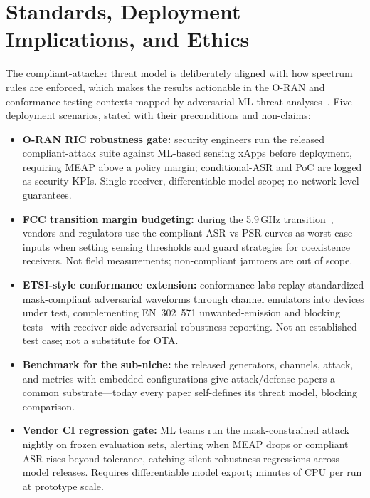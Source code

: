 \documentclass[review]{elsarticle}
\begin{document}
\section{Standards, Deployment Implications, and Ethics}
\label{sec:standards}

The compliant-attacker threat model is deliberately aligned with how
spectrum rules are enforced, which makes the results actionable in the
O-RAN and conformance-testing contexts mapped by adversarial-ML threat
analyses~\cite{habler2025}. Five deployment scenarios, stated with their
preconditions and non-claims:

\begin{itemize}
\item \textbf{O-RAN RIC robustness gate:} security engineers run the
released compliant-attack suite against ML-based sensing xApps before
deployment, requiring MEAP above a policy margin; conditional-ASR and PoC
are logged as security KPIs. Single-receiver, differentiable-model scope; no
network-level guarantees.
\item \textbf{FCC transition margin budgeting:} during the 5.9\,GHz
transition~\cite{fcc2020,fcc2024}, vendors and regulators use the
compliant-ASR-vs-PSR curves as worst-case inputs when setting sensing
thresholds and guard strategies for coexistence receivers. Not field
measurements; non-compliant jammers are out of scope.
\item \textbf{ETSI-style conformance extension:} conformance labs replay
standardized mask-compliant adversarial waveforms through channel emulators
into devices under test, complementing EN~302~571 unwanted-emission and
blocking tests~\cite{etsi302571} with receiver-side adversarial robustness
reporting. Not an established test case; not a substitute for OTA.
\item \textbf{Benchmark for the sub-niche:} the released generators,
channels, attack, and metrics with embedded configurations give
attack/defense papers a common substrate---today every paper self-defines
its threat model, blocking comparison.
\item \textbf{Vendor CI regression gate:} ML teams run the mask-constrained
attack nightly on frozen evaluation sets, alerting when MEAP drops or
compliant ASR rises beyond tolerance, catching silent robustness
regressions across model releases. Requires differentiable model export;
minutes of CPU per run at prototype scale.
\end{itemize}
\end{document}
